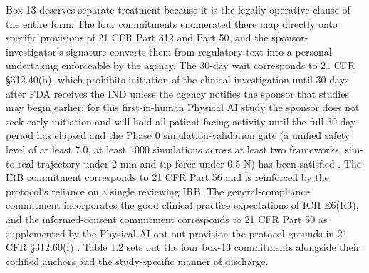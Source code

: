 \vspace{-1.75cm}

Box 13 deserves separate treatment because it is the legally operative
clause of the entire form. The four commitments enumerated there map
directly onto specific provisions of 21 CFR Part 312 and Part 50, and the
sponsor-investigator's signature converts them from regulatory text into a
personal undertaking enforceable by the agency. The 30-day wait
corresponds to 21 CFR \S 312.40(b), which prohibits initiation of the
clinical investigation until 30 days after FDA receives the IND unless the
agency notifies the sponsor that studies may begin earlier; for this
first-in-human Physical AI study the sponsor does not seek early
initiation and will hold all patient-facing activity until the full 30-day
period has elapsed and the Phase 0 simulation-validation gate (a unified
safety level of at least 7.0, at least 1000 simulations across at least
two frameworks, sim-to-real trajectory under 2 mm and tip-force under
0.5 N) has been satisfied \cite{cfr312paiuni, paipredict4x}. The IRB
commitment corresponds to 21 CFR Part 56 and is reinforced by the
protocol's reliance on a single reviewing IRB. The general-compliance
commitment incorporates the good clinical practice expectations of ICH
E6(R3), and the informed-consent commitment corresponds to 21 CFR Part 50
as supplemented by the Physical AI opt-out provision the protocol grounds
in 21 CFR \S 312.60(f) \cite{cfr050paiuni, ichpaistduni}. Table 1.2 sets
out the four box-13 commitments alongside their codified anchors and the
study-specific manner of discharge.

